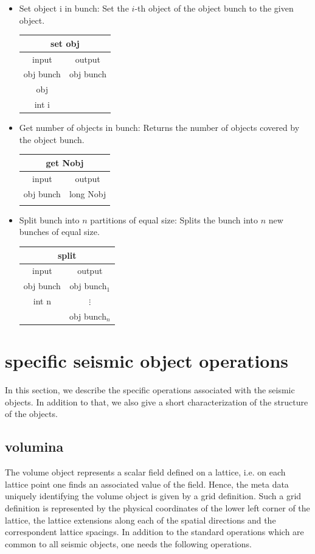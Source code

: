 \documentclass[12pt,a4paper]{article}
\newcommand{\bet}[1]{\begin{center}
		     \begin{tabular}{|c|c|}
		     \hline
		     \multicolumn{2}{|c|}{#1}\\
		     \hline\hline
		     input & output \\
                     \hline}
\newcommand{\eet}{\hline
		  \end{tabular}
		  \end{center}}
\begin{document}
\begin{itemize}
Returns the $i$-th object of the object bunch.
\bet{get obj}
obj bunch & obj \\
int i     &     \\
\eet
\item Set object i in bunch:
\newline
Set the $i$-th object of the object bunch to 
the given object.
\bet{set obj}
obj bunch & obj bunch\\
obj       &  \\
int i     &  \\
\eet
\item Get number of objects in bunch:
\newline
Returns the number of objects covered by the object bunch. 
\bet{get Nobj}
obj bunch & long Nobj\\
          &          \\
\eet
\item Split bunch into $n$ partitions of equal size:
\newline
Splits the bunch into $n$ new bunches of equal size.
\bet{split}
obj bunch & obj bunch$_1$ \\
int n     & $\vdots$\\
          & obj bunch$_n$\\
\eet
\end{itemize}

\section{specific seismic object operations}

In this section, we describe the specific operations
associated with the seismic objects. In addition to
that, we also give a short characterization of the 
structure of the objects. 

\subsection{volumina}

The volume object represents a scalar field defined on a 
lattice, i.e. on each lattice point one finds an associated 
value of the field. Hence, the meta data uniquely identifying
the volume object is given by a grid definition. Such a 
grid definition is represented by the physical coordinates of the 
lower left corner of the lattice, the lattice extensions along
each of the spatial directions and the correspondent lattice spacings. 
In addition to the standard operations which are common
to all seismic objects, one needs the following operations.
\end{document}
